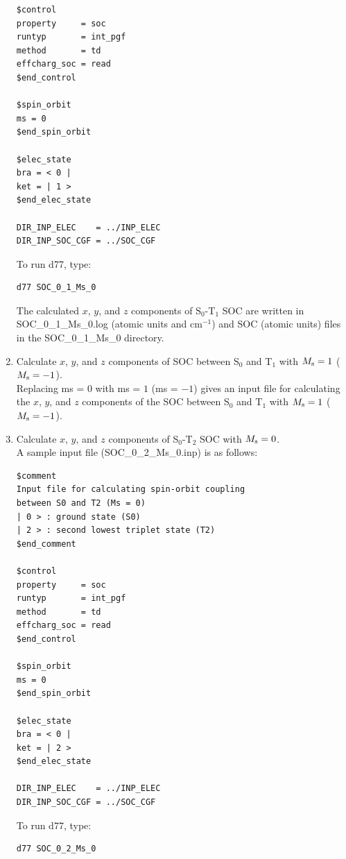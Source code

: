 ﻿\documentclass[11pt,a4paper,openany]{article}
\begin{document}
\begin{enumerate}
{\begin{verbatim}
$control
property     = soc
runtyp       = int_pgf
method       = td
effcharg_soc = read
$end_control

$spin_orbit
ms = 0
$end_spin_orbit

$elec_state
bra = < 0 |
ket = | 1 >
$end_elec_state

DIR_INP_ELEC    = ../INP_ELEC
DIR_INP_SOC_CGF = ../SOC_CGF
\end{verbatim}
To run d77, type:
\begin{verbatim} 
d77 SOC_0_1_Ms_0
\end{verbatim}
The calculated $x$, $y$, and $z$ components of S$_0$-T$_1$ SOC are written 
in SOC\_0\_1\_Ms\_0.log (atomic units and cm$^{-1}$) and SOC (atomic units) files 
in the SOC\_0\_1\_Ms\_0 directory.
}

\item{
Calculate $x$, $y$, and $z$ components of SOC 
between S$_0$ and T$_1$ with $M_{\rm{s}} =1$ ($M_{\rm{s}} = -1$).\\
Replacing ms = $0$ with ms = $1$ (ms = $-1$) gives an input file 
for calculating the $x$, $y$, and $z$ components of 
the SOC between S$_0$ and T$_1$ with $M_{\rm{s}} = 1$ ($M_{\rm{s}} = -1$).
}

\item{
Calculate $x$, $y$, and $z$ components of S$_0$-T$_2$ SOC with $M_{\rm{s}} = 0$.\\
A sample input file (SOC\_0\_2\_Ms\_0.inp) is as follows:
\begin{verbatim} 
$comment
Input file for calculating spin-orbit coupling
between S0 and T2 (Ms = 0)
| 0 > : ground state (S0)
| 2 > : second lowest triplet state (T2)
$end_comment

$control
property     = soc
runtyp       = int_pgf
method       = td
effcharg_soc = read
$end_control

$spin_orbit
ms = 0
$end_spin_orbit

$elec_state
bra = < 0 |
ket = | 2 >
$end_elec_state

DIR_INP_ELEC    = ../INP_ELEC
DIR_INP_SOC_CGF = ../SOC_CGF
\end{verbatim}
To run d77, type:
\begin{verbatim} 
d77 SOC_0_2_Ms_0
\end{verbatim}
}

\end{enumerate}

\end{document}
